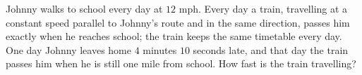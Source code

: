 Johnny walks to school every day at $12$ mph. Every day a train, travelling at a constant speed parallel to Johnny's route and in the same direction, passes him exactly when he reaches school; the train keeps the same timetable every day. One day Johnny leaves home $4$ minutes $10$ seconds late, and that day the train passes him when he is still one mile from school. How fast is the train travelling?
